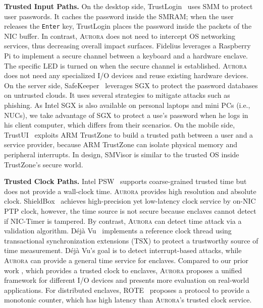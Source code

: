 \documentclass[journal,twocolumn,letterpaper,10pt]{IEEEtran}
\begin{document}
\textbf{Trusted Input Paths.}
On the desktop side, TrustLogin~\cite{zhang_trustlogin:_2015} uses SMM to protect user passwords. It caches the password inside the SMRAM; when the user releases the \texttt{Enter} key, TrustLogin places the password inside the packets of the NIC buffer. In contrast, \textsc{Aurora} does not need to intercept OS networking services, thus decreasing overall impact surfaces.
Fidelius \cite{DBLP:journals/corr/abs-1809-04774} leverages a Raspberry Pi to implement a secure channel between a keyboard and a hardware enclave. The specific LED is turned on when the secure channel is established.  \textsc{Aurora} does not need any specialized I/O devices and reuse existing hardware devices.
On the server side, SafeKeeper~\cite{DBLP:conf/www/KrawieckaKPMA18} leverages SGX to protect the password databases on untrusted clouds. It uses several strategies to mitigate attacks such as phishing. As Intel SGX is also available on personal laptops and mini PCs (i.e., NUCs), we take advantage of SGX to protect a use's password when he logs in his client computer, which differs from their scenarios.
On the mobile side, TrustUI~\cite{DBLP:conf/apsys/LiMHXZCL14} exploits ARM TrustZone to build a trusted path between a user and a service provider, because ARM TrustZone can isolate physical memory and peripheral interrupts. In design, SMVisor is similar to the trusted OS inside TrustZone's secure world.

\textbf{Trusted Clock Paths.} Intel PSW~\cite{intel_psw} supports coarse-grained trusted time but does not provide a wall-clock time. \textsc{Aurora} provides high resolution and absolute clock. ShieldBox~\cite{DBLP:conf/sosr/TrachKGABF18} achieves high-precision yet low-latency clock service by on-NIC PTP clock, however, the time source is not secure because enclaves cannot detect if NIC-Timer is tampered. By contrast, \textsc{Aurora} can detect time attack via a validation algorithm. Déjà Vu~\cite{DBLP:conf/ccs/ChenZRZ17} implements a reference clock thread using transactional synchronization extensions (TSX) to protect a trustworthy source of time measurement. Déjà Vu's goal is to detect interrupt-based attacks, while \textsc{Aurora} can provide a general time service for enclaves. Compared to our prior work \cite{DBLP:conf/eurosys/LiangL18}, which provides a trusted clock to enclaves, \textsc{Aurora} proposes a unified framework for different I/O devices and presents more evaluation on real-world applications. For distributed enclaves, ROTE~\cite{DBLP:conf/uss/MateticAKDSGJC17} proposes a protocol to provide a monotonic counter, which has high latency than \textsc{Aurora}'s trusted clock service.
\end{document}
